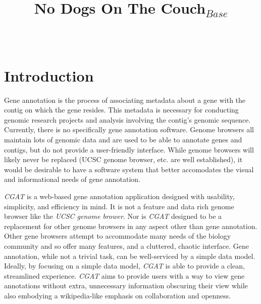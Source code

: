 \documentclass[]{IEEEtran}
\begin{document}
\title{No Dogs On The Couch$_{Base}$}


\author{
\\
}

\maketitle

\thispagestyle{empty}
\pagestyle{empty}

\section{Introduction}\label{sec:introduction}
Gene annotation is the process of associating metadata about a gene with the
contig on which the gene resides. This metadata is necessary for conducting
genomic research projects and analysis involving the contig's genomic sequence.
Currently, there is no specifically gene annotation software. Genome browsers
all maintain lots of genomic data and are used to be able to annotate genes and
contigs, but do not provide a user-friendly interface. While genome browsers
will likely never be replaced (UCSC genome browser, etc. are well
established), it would be desirable to have a software system that better
accomodates the visual and informational needs of gene annotation.

\textit{CGAT} is a web-based gene annotation application designed with
usability, simplicity, and efficiency in mind. It is not a feature and data
rich genome browser like the \textit{UCSC genome brower}. Nor is \textit{CGAT}
designed to be a replacement for other genome browsers in any aspect other than
gene annotation. Other gene browsers attempt to accommodate many needs of the
biology community and so offer many features, and a cluttered, chaotic
interface. Gene annotation, while not a trivial task, can be well-serviced by a
simple data model. Ideally, by focusing on a simple data model, \textit{CGAT}
is able to provide a clean, streamlined experience. \textit{CGAT} aims to
provide users with a way to view gene annotations without extra, unnecessary
information obscuring their view while also embodying a wikipedia-like emphasis
on collaboration and openness.
\end{document}
